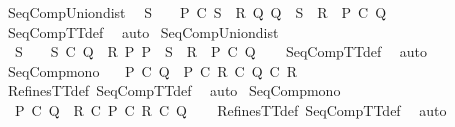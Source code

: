\begin{isabellebody}
\isanewline
%
\endisadelimproof
\isanewline
{}\isamarkupfalse%
\ SeqComp{\isacharunderscore}Union{\isacharunderscore}dist{}{\isacharcolon}\isanewline
\ \ {\isachardoublequoteopen}S\ {\isasymnoteq}\ {\isacharbraceleft}{\isacharbraceright}\ {\isasymLongrightarrow}\ P\ {\isacharsemicolon}\isactrlsub C\ {\isacharparenleft}{\isasymUnion}S{\isacharparenright}\ {\isacharequal}\ {\isasymUnion}{\isacharbraceleft}R{\isachardot}\ {\isasymexists}Q{\isachardot}\ Q\ {\isasymin}\ S\ {\isasymand}\ R\ {\isacharequal}\ P\ {\isacharsemicolon}\isactrlsub C\ Q{\isacharbraceright}{\isachardoublequoteclose}\isanewline
%
\isadelimproof
\ \ %
\endisadelimproof
%
\isatagproof
{}\isamarkupfalse%
\ SeqCompTT{\isacharunderscore}def\ \isamarkupfalse%
\ auto%
\endisatagproof
{\isafoldproof}%
%
\isadelimproof
\isanewline
%
\endisadelimproof
\isanewline
{}\isamarkupfalse%
\ SeqComp{\isacharunderscore}Union{\isacharunderscore}dist{}{\isacharcolon}\isanewline
\ \ {\isachardoublequoteopen}S\ {\isasymnoteq}\ {\isacharbraceleft}{\isacharbraceright}\ {\isasymLongrightarrow}\ {\isacharparenleft}{\isasymUnion}S{\isacharparenright}\ {\isacharsemicolon}\isactrlsub C\ Q\ {\isacharequal}\ {\isasymUnion}{\isacharbraceleft}R{\isachardot}\ {\isasymexists}P{\isachardot}\ P\ {\isasymin}\ S\ {\isasymand}\ R\ {\isacharequal}\ P\ {\isacharsemicolon}\isactrlsub C\ Q{\isacharbraceright}{\isachardoublequoteclose}\isanewline
%
\isadelimproof
\ \ %
\endisadelimproof
%
\isatagproof
{}\isamarkupfalse%
\ SeqCompTT{\isacharunderscore}def\ \isamarkupfalse%
\ auto%
\endisatagproof
{\isafoldproof}%
%
\isadelimproof
\isanewline
%
\endisadelimproof
\isanewline
{}\isamarkupfalse%
\ SeqComp{\isacharunderscore}mono{}{\isacharcolon}\ \isanewline
\ \ {\isachardoublequoteopen}P\ {\isasymsqsubseteq}\isactrlsub C\ Q\ {\isasymLongrightarrow}\ P\ {\isacharsemicolon}\isactrlsub C\ R\ {\isasymsqsubseteq}\isactrlsub C\ Q\ {\isacharsemicolon}\isactrlsub C\ R{\isachardoublequoteclose}\isanewline
%
\isadelimproof
\ \ %
\endisadelimproof
%
\isatagproof
{}\isamarkupfalse%
\ RefinesTT{\isacharunderscore}def\ SeqCompTT{\isacharunderscore}def\ \isamarkupfalse%
\ auto%
\endisatagproof
{\isafoldproof}%
%
\isadelimproof
\isanewline
%
\endisadelimproof
\isanewline
{}\isamarkupfalse%
\ SeqComp{\isacharunderscore}mono{}{\isacharcolon}\ \isanewline
\ \ {\isachardoublequoteopen}P\ {\isasymsqsubseteq}\isactrlsub C\ Q\ {\isasymLongrightarrow}\ R\ {\isacharsemicolon}\isactrlsub C\ P\ {\isasymsqsubseteq}\isactrlsub C\ R\ {\isacharsemicolon}\isactrlsub C\ Q{\isachardoublequoteclose}\isanewline
%
\isadelimproof
\ \ %
\endisadelimproof
%
\isatagproof
{}\isamarkupfalse%
\ RefinesTT{\isacharunderscore}def\ SeqCompTT{\isacharunderscore}def\ \isamarkupfalse%
\ auto%
\endisatagproof
{\isafoldproof}%
%
\isadelimproof
\isanewline
%
\endisadelimproof
%
\isadelimtheory
\isanewline
%
\endisadelimtheory
%
\isatagtheory
{}\isamarkupfalse%
%
\endisatagtheory
{\isafoldtheory}%
%
\isadelimtheory
%
\endisadelimtheory
%
\end{isabellebody}%
